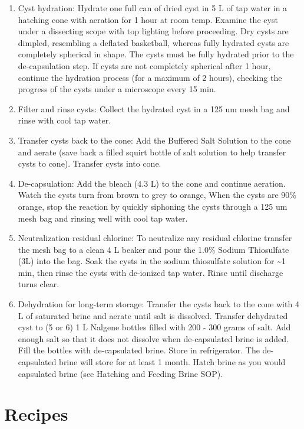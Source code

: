 \documentclass[
]{book}
\providecommand{\tightlist}{%
  \setlength{\itemsep}{0pt}\setlength{\parskip}{0pt}}
\begin{document}
\begin{enumerate}
\def\labelenumi{\arabic{enumi}.}
\tightlist
\item
  Cyst hydration: Hydrate one full can of dried cyst in 5 L of tap water in a hatching cone with aeration for 1 hour at room temp. Examine the cyst under a dissecting scope with top lighting before proceeding. Dry cysts are dimpled, resembling a deflated basketball, whereas fully hydrated cysts are completely spherical in shape. The cysts must be fully hydrated prior to the de-capsulation step. If cysts are not completely spherical after 1 hour, continue the hydration process (for a maximum of 2 hours), checking the progress of the cysts under a microscope every 15 min.
\item
  Filter and rinse cysts: Collect the hydrated cyst in a 125 um mesh bag and rinse with cool tap water.
\item
  Transfer cysts back to the cone: Add the Buffered Salt Solution to the cone and aerate (save back a filled squirt bottle of salt solution to help transfer cysts to cone). Transfer cysts into cone.
\item
  De-capsulation: Add the bleach (4.3 L) to the cone and continue aeration. Watch the cysts turn from brown to grey to orange, When the cysts are 90\% orange, stop the reaction by quickly siphoning the cysts through a 125 um mesh bag and rinsing well with cool tap water.
\item
  Neutralization residual chlorine: To neutralize any residual chlorine transfer the mesh bag to a clean 4 L beaker and pour the 1.0\% Sodium Thiosulfate (3L) into the bag. Soak the cysts in the sodium thiosulfate solution for \textasciitilde1 min, then rinse the cysts with de-ionized tap water. Rinse until discharge turns clear.
\item
  Dehydration for long-term storage: Transfer the cysts back to the cone with 4 L of saturated brine and aerate until salt is dissolved. Transfer dehydrated cyst to (5 or 6) 1 L Nalgene bottles filled with 200 - 300 grams of salt. Add enough salt so that it does not dissolve when de-capsulated brine is added. Fill the bottles with de-capsulated brine. Store in refrigerator. The de-capsulated brine will store for at least 1 month. Hatch brine as you would capsulated brine (see Hatching and Feeding Brine SOP).
\end{enumerate}

\hypertarget{recipes}{%
\chapter{Recipes}\label{recipes}}
\end{document}
